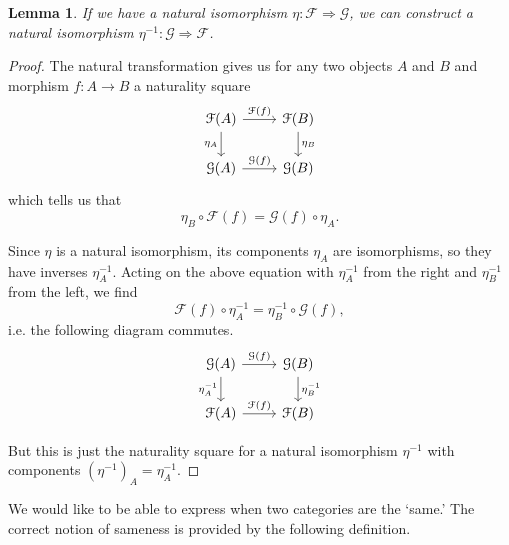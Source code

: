 \documentclass[a4paper]{report}
\theoremstyle{definition}
\theoremstyle{plain}
\newtheorem{lemma}{Lemma}[section]
\theoremstyle{remark}
\begin{document}
\begin{lemma}
  \label{lemma:naturalisomorphismshaveinverses}
  If we have a natural isomorphism $\eta\colon \mathcal{F} \Rightarrow \mathcal{G}$, we can construct a natural isomorphism $\eta^{-1}\colon \mathcal{G} \Rightarrow \mathcal{F}$.
\end{lemma}
\begin{proof}
  The natural transformation gives us for any two objects $A$ and $B$ and morphism $f\colon A \to B$ a naturality square
  \begin{equation*}
    \begin{tikzcd}
      \mathcal{F}(A)
      \arrow[r, "\mathcal{F}(f)"]
      \arrow[d, swap, "\eta_{A}"]
      & \mathcal{F}(B)
      \arrow[d, "\eta_{B}"]
      \\
      \mathcal{G}(A)
      \arrow[r, "\mathcal{G}(f)"]
      & \mathcal{G}(B)
    \end{tikzcd}
  \end{equation*}
  which tells us that 
  \begin{equation*}
    \eta_{B} \circ \mathcal{F}(f) = \mathcal{G}(f) \circ \eta_{A}.
  \end{equation*}

  Since $\eta$ is a natural isomorphism, its components $\eta_{A}$ are isomorphisms, so they have inverses $\eta_{A}^{-1}$. Acting on the above equation with $\eta_{A}^{-1}$ from the right and $\eta_{B}^{-1}$ from the left, we find
  \begin{equation*}
    \mathcal{F}(f) \circ \eta_{A}^{-1} = \eta_{B}^{-1} \circ \mathcal{G}(f),
  \end{equation*}
  i.e. the following diagram commutes.
  \begin{equation*}
    \begin{tikzcd}
      \mathcal{G}(A)
      \arrow[r, "\mathcal{G}(f)"]
      \arrow[d, swap, "\eta_{A}^{-1}"]
      & \mathcal{G}(B)
      \arrow[d, "\eta_{B}^{-1}"]
      \\
      \mathcal{F}(A)
      \arrow[r, "\mathcal{F}(f)"]
      & \mathcal{F}(B)
    \end{tikzcd}
  \end{equation*}

  But this is just the naturality square for a natural isomorphism $\eta^{-1}$ with components $(\eta^{-1})_{A} = \eta_{A}^{-1}$.
\end{proof}

We would like to be able to express when two categories are the `same.' The correct notion of sameness is provided by the following definition.
\end{document}
